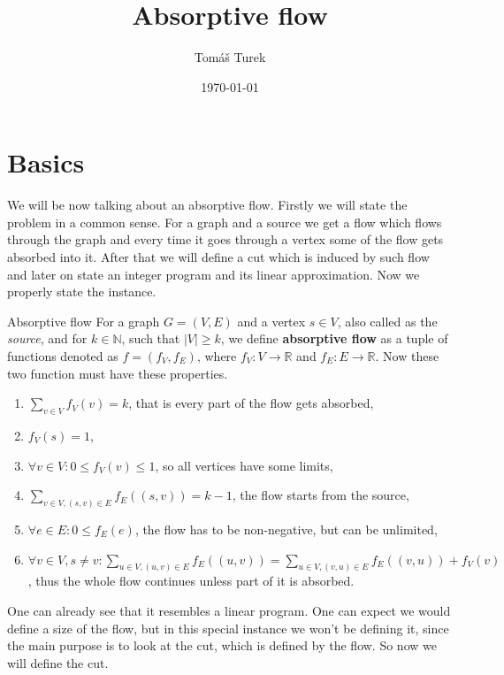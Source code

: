 \documentclass{article}
\title{Absorptive flow}
\author{Tomáš Turek}
\date{\today}
\begin{document}
	\maketitle
	
	\section{Basics}
	
	We will be now talking about an absorptive flow. Firstly we will state the problem in a common sense. For a graph and a source we get a flow which flows through the graph and every time it goes through a vertex some of the flow gets absorbed into it. After that we will define a cut which is induced by such flow and later on state an integer program and its linear approximation. Now we properly state the instance.
	
	\begin{defn}{Absorptive flow}
		For a graph $G = (V,E)$ and a vertex $s \in V$, also called as the \textit{source}, and for $k \in \mathbb{N}$, such that $|V| \geq k$, we define \textbf{absorptive flow} as a tuple of functions denoted as $f = (f_V, f_E)$, where $f_V : V \to \mathbb{R}$ and $f_E : E \to \mathbb{R}$. Now these two function must have these properties.
		
		\begin{enumerate}
			\item $\sum_{v \in V} f_V (v) = k$, that is every part of the flow gets absorbed,
			\item $f_V(s) = 1$,
			\item $\forall v \in V : 0 \leq f_V(v) \leq 1$, so all vertices have some limits,
			\item $\sum_{v \in V, (s,v) \in E} f_E((s,v)) = k-1$, the flow starts from the source,
			\item $\forall e \in E : 0 \leq f_E(e)$, the flow has to be non-negative, but can be unlimited,
			\item $\forall v \in V, s \neq v : \sum_{u \in V, (u,v) \in E} f_E((u,v)) = \sum_{u \in V, (v,u) \in E} f_E((v,u)) + f_V(v)$, thus the whole flow continues unless part of it is absorbed.
		\end{enumerate}
	\end{defn}
	
	One can already see that it resembles a linear program. One can expect we would define a size of the flow, but in this special instance we won't be defining it, since the main purpose is to look at the cut, which is defined by the flow. So now we will define the cut.
	
\end{document}

